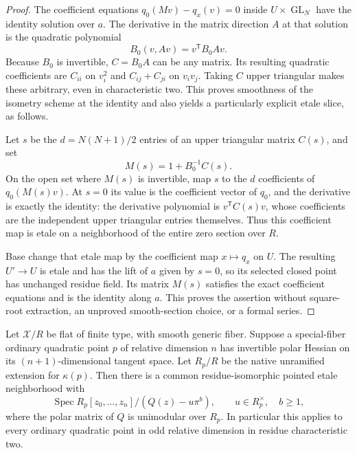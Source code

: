 \begin{proof}
The coefficient equations $q_0(Mv)-q_x(v)=0$ inside
$U\times\operatorname{GL}_N$ have the identity solution
over $a$. The derivative in the matrix direction $A$
at that solution is the quadratic polynomial
\[
                   B_0(v,Av)=v^{\mathsf T}B_0Av.
 \tag{C217.5}\label{r17c2:differential}
\]
Because $B_0$ is invertible, $C=B_0A$ can be any matrix.
Its resulting quadratic coefficients are $C_{ii}$ on
$v_i^2$ and $C_{ij}+C_{ji}$ on $v_iv_j$. Taking $C$
upper triangular makes these arbitrary, even in
characteristic two. This proves smoothness of the
isometry scheme at the identity and also yields a
particularly explicit etale slice, as follows.

Let $s$ be the $d=N(N+1)/2$ entries of an upper triangular
matrix $C(s)$, and set
\[
                M(s)=1+B_0^{-1}C(s).
\]
On the open set where $M(s)$ is invertible, map $s$ to
the $d$ coefficients of $q_0(M(s)v)$. At $s=0$ its
value is the coefficient vector of $q_0$, and the
derivative is exactly the identity: the derivative
polynomial is $v^{\mathsf T}C(s)v$, whose coefficients
are the independent upper triangular entries themselves.
Thus this coefficient map is etale on a neighborhood of
the entire zero section over $R$.

Base change that etale map by the coefficient map
$x\mapsto q_x$ on $U$. The resulting $U'\to U$ is
etale and has the lift of $a$ given by $s=0$, so its
selected closed point has unchanged residue field.
Its matrix $M(s)$ satisfies the exact coefficient
equations and is the identity along $a$. This proves
the assertion without square-root extraction, an
unproved smooth-section choice, or a formal series.
\end{proof}

\begin{proposition}
\label{r17c2:normal-form}
Let $\mathcal X/R$ be flat of finite type, with smooth
generic fiber. Suppose a special-fiber ordinary quadratic
point $p$ of relative dimension $n$ has invertible polar
Hessian on its $(n+1)$-dimensional tangent space.
Let $R_p/R$ be the native unramified extension for
$\kappa(p)$. Then there is a common residue-isomorphic
pointed etale neighborhood with
\[
 \operatorname{Spec}R_p[z_0,\ldots,z_n]/(Q(z)-u\pi^b),
       \qquad u\in R_p^\times,\quad b\ge1,
 \tag{C217.6}\label{r17c2:normal-equation}
\]
where the polar matrix of $Q$ is unimodular over $R_p$.
In particular this applies to every ordinary quadratic
point in odd relative dimension in residue characteristic
two.
\end{proposition}

